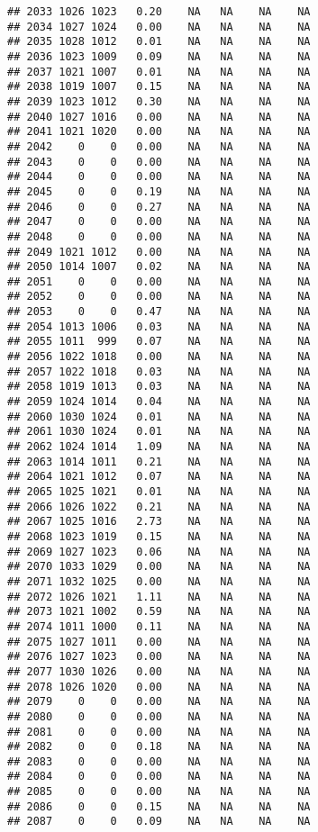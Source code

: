 \documentclass{article}\usepackage{graphicx, color}
\makeatletter
\newenvironment{kframe}{%
 \def\at@end@of@kframe{}%
 \ifinner\ifhmode%
  \def\at@end@of@kframe{\end{minipage}}%
  \begin{minipage}{\columnwidth}%
 \fi\fi%
 \def\FrameCommand##1{\hskip\@totalleftmargin \hskip-\fboxsep
 \colorbox{shadecolor}{##1}\hskip-\fboxsep
     \hskip-\linewidth \hskip-\@totalleftmargin \hskip\columnwidth}%
 \MakeFramed {\advance\hsize-\width
   \@totalleftmargin\z@ \linewidth\hsize
   \@setminipage}}%
 {\par\unskip\endMakeFramed%
 \at@end@of@kframe}
\newenvironment{knitrout}{}{} %
\makeatother
\begin{document}
\begin{knitrout}
\begin{kframe}
\begin{verbatim}
## 2033 1026 1023   0.20    NA   NA    NA    NA
## 2034 1027 1024   0.00    NA   NA    NA    NA
## 2035 1028 1012   0.01    NA   NA    NA    NA
## 2036 1023 1009   0.09    NA   NA    NA    NA
## 2037 1021 1007   0.01    NA   NA    NA    NA
## 2038 1019 1007   0.15    NA   NA    NA    NA
## 2039 1023 1012   0.30    NA   NA    NA    NA
## 2040 1027 1016   0.00    NA   NA    NA    NA
## 2041 1021 1020   0.00    NA   NA    NA    NA
## 2042    0    0   0.00    NA   NA    NA    NA
## 2043    0    0   0.00    NA   NA    NA    NA
## 2044    0    0   0.00    NA   NA    NA    NA
## 2045    0    0   0.19    NA   NA    NA    NA
## 2046    0    0   0.27    NA   NA    NA    NA
## 2047    0    0   0.00    NA   NA    NA    NA
## 2048    0    0   0.00    NA   NA    NA    NA
## 2049 1021 1012   0.00    NA   NA    NA    NA
## 2050 1014 1007   0.02    NA   NA    NA    NA
## 2051    0    0   0.00    NA   NA    NA    NA
## 2052    0    0   0.00    NA   NA    NA    NA
## 2053    0    0   0.47    NA   NA    NA    NA
## 2054 1013 1006   0.03    NA   NA    NA    NA
## 2055 1011  999   0.07    NA   NA    NA    NA
## 2056 1022 1018   0.00    NA   NA    NA    NA
## 2057 1022 1018   0.03    NA   NA    NA    NA
## 2058 1019 1013   0.03    NA   NA    NA    NA
## 2059 1024 1014   0.04    NA   NA    NA    NA
## 2060 1030 1024   0.01    NA   NA    NA    NA
## 2061 1030 1024   0.01    NA   NA    NA    NA
## 2062 1024 1014   1.09    NA   NA    NA    NA
## 2063 1014 1011   0.21    NA   NA    NA    NA
## 2064 1021 1012   0.07    NA   NA    NA    NA
## 2065 1025 1021   0.01    NA   NA    NA    NA
## 2066 1026 1022   0.21    NA   NA    NA    NA
## 2067 1025 1016   2.73    NA   NA    NA    NA
## 2068 1023 1019   0.15    NA   NA    NA    NA
## 2069 1027 1023   0.06    NA   NA    NA    NA
## 2070 1033 1029   0.00    NA   NA    NA    NA
## 2071 1032 1025   0.00    NA   NA    NA    NA
## 2072 1026 1021   1.11    NA   NA    NA    NA
## 2073 1021 1002   0.59    NA   NA    NA    NA
## 2074 1011 1000   0.11    NA   NA    NA    NA
## 2075 1027 1011   0.00    NA   NA    NA    NA
## 2076 1027 1023   0.00    NA   NA    NA    NA
## 2077 1030 1026   0.00    NA   NA    NA    NA
## 2078 1026 1020   0.00    NA   NA    NA    NA
## 2079    0    0   0.00    NA   NA    NA    NA
## 2080    0    0   0.00    NA   NA    NA    NA
## 2081    0    0   0.00    NA   NA    NA    NA
## 2082    0    0   0.18    NA   NA    NA    NA
## 2083    0    0   0.00    NA   NA    NA    NA
## 2084    0    0   0.00    NA   NA    NA    NA
## 2085    0    0   0.00    NA   NA    NA    NA
## 2086    0    0   0.15    NA   NA    NA    NA
## 2087    0    0   0.09    NA   NA    NA    NA

\end{verbatim}
\end{kframe}
\end{knitrout}
\end{document}
